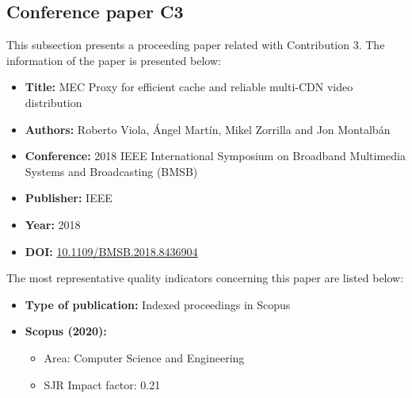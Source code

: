 \subsection{Conference paper C3}
\label{chap:BMSB2018}
This subsection presents a proceeding paper related with Contribution 3.
The information of the paper is presented below:
\begin{itemize} \itemsep1pt\parskip0pt
	\item \textbf{Title:} MEC Proxy for efficient cache and reliable multi-CDN video distribution
	\item \textbf{Authors:} Roberto Viola, \'Angel Mart\'in, Mikel Zorrilla and Jon Montalb\'an
	\item \textbf{Conference:} 2018 IEEE International Symposium on Broadband Multimedia Systems and Broadcasting (BMSB)
	\item \textbf{Publisher:} IEEE
	\item \textbf{Year:} 2018
	\item \textbf{DOI:} \url{10.1109/BMSB.2018.8436904}
\end{itemize}
The most representative quality indicators concerning this paper are listed below:
\begin{itemize} \itemsep1pt\parskip0pt
	\item \textbf{Type of publication:} Indexed proceedings in Scopus
	\item \textbf{Scopus (2020):}
	\begin{itemize}
		\item Area: Computer Science and Engineering
		\item SJR Impact factor: 0.21
	\end{itemize}
\end{itemize}
